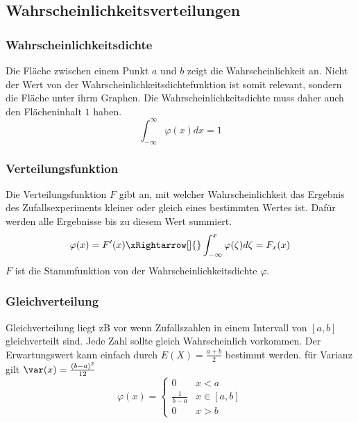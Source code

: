 \subsection{Wahrscheinlichkeitsverteilungen}
\subsubsection{Wahrscheinlichkeitsdichte}
Die Fläche zwischen einem Punkt $a$ und $b$ zeigt die Wahrscheinlichkeit an. Nicht der Wert von der Wahrscheinlichkeitsdichtefunktion ist somit relevant, sondern die Fläche unter ihrm Graphen. Die Wahrscheinlichkeitsdichte muss daher auch den Flächeninhalt $1$ haben. 
\[
\int_{-\infty}^{\infty}\varphi(x)dx = 1
\]

\subsubsection{Verteilungsfunktion}
Die Verteilungsfunktion $F$ gibt an, mit welcher Wahrscheinlichkeit das Ergebnis des Zufallsexperiments kleiner oder gleich eines bestimmten Wertes ist. Dafür werden alle Ergebnisse bis zu diesem Wert summiert. 
\[
\varphi(x) = F'(x) \xRightarrow[]{} \int_{-\infty}^{x}\varphi(\zeta)d\zeta = F_x(x)
\]
$F$ ist die Stammfunktion von der Wahrscheinlichkeitsdichte $\varphi$.

\subsubsection{Gleichverteilung}
Gleichverteilung liegt zB vor wenn Zufallszahlen  in einem Intervall von $[a, b]$ gleichverteilt sind. Jede Zahl sollte gleich Wahrscheinlich vorkommen. Der Erwartungswert kann einfach durch $E(X) = \frac{a + b}{2}$ bestimmt werden. für Varianz gilt $\var(x) = \frac{(b-a)^2}{12}$
\[
\varphi(x) = \begin{cases}
	0 & x < a \\
	\frac{1}{b-a} & x \in [a,b] \\
	0 & x > b
\end{cases}
\]


